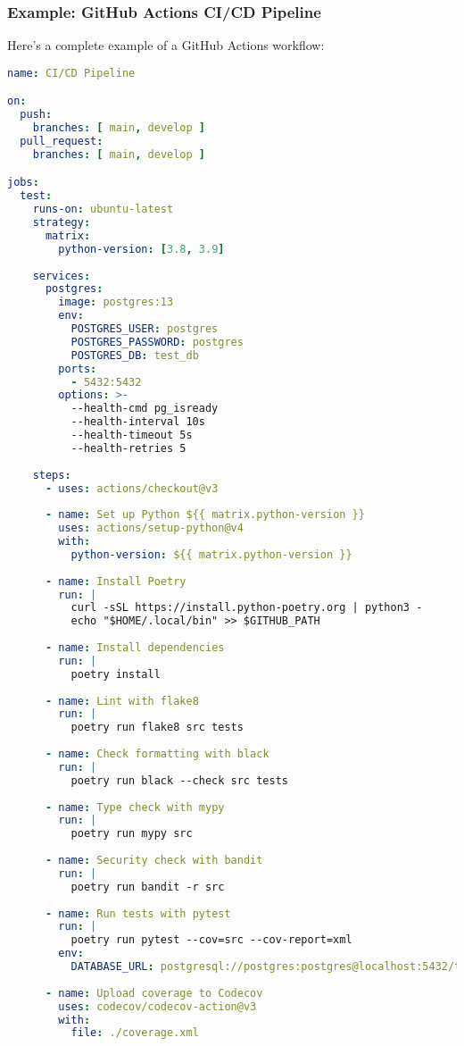 \subsubsection{Example: GitHub Actions CI/CD Pipeline}
Here's a complete example of a GitHub Actions workflow:

\begin{lstlisting}[language=yaml, caption=Complete GitHub Actions CI/CD Pipeline]
name: CI/CD Pipeline

on:
  push:
    branches: [ main, develop ]
  pull_request:
    branches: [ main, develop ]

jobs:
  test:
    runs-on: ubuntu-latest
    strategy:
      matrix:
        python-version: [3.8, 3.9]
    
    services:
      postgres:
        image: postgres:13
        env:
          POSTGRES_USER: postgres
          POSTGRES_PASSWORD: postgres
          POSTGRES_DB: test_db
        ports:
          - 5432:5432
        options: >-
          --health-cmd pg_isready
          --health-interval 10s
          --health-timeout 5s
          --health-retries 5
    
    steps:
      - uses: actions/checkout@v3
      
      - name: Set up Python ${{ matrix.python-version }}
        uses: actions/setup-python@v4
        with:
          python-version: ${{ matrix.python-version }}
      
      - name: Install Poetry
        run: |
          curl -sSL https://install.python-poetry.org | python3 -
          echo "$HOME/.local/bin" >> $GITHUB_PATH
      
      - name: Install dependencies
        run: |
          poetry install
      
      - name: Lint with flake8
        run: |
          poetry run flake8 src tests
      
      - name: Check formatting with black
        run: |
          poetry run black --check src tests
      
      - name: Type check with mypy
        run: |
          poetry run mypy src
      
      - name: Security check with bandit
        run: |
          poetry run bandit -r src
      
      - name: Run tests with pytest
        run: |
          poetry run pytest --cov=src --cov-report=xml
        env:
          DATABASE_URL: postgresql://postgres:postgres@localhost:5432/test_db
      
      - name: Upload coverage to Codecov
        uses: codecov/codecov-action@v3
        with:
          file: ./coverage.xml
  

\end{lstlisting}
